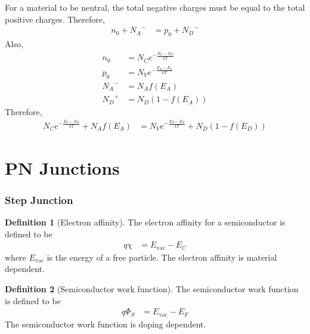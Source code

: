 \documentclass[titlepage, fleqn, a4paper, 12pt, twoside]{article}
\theoremstyle{definition}
\newtheorem{definition}{Definition}
\theoremstyle{theorem}
\begin{document}
For a material to be neutral, the total negative charges must be equal to the total positive charges.
Therefore,
\begin{align*}
	n_0 + {N_A}^- & = p_0 + {N_D}^-
\end{align*}
Also,
\begin{align*}
	n_0     & = N_C e^{-\frac{E_C - E_F}{k T}} \\
	p_0     & = N_V e^{-\frac{E_F - E_V}{k T}} \\
	{N_A}^- & = N_A f(E_A)                     \\
	{N_D}^+ & = N_D \left( 1 - f(E_A) \right)
\end{align*}
Therefore,
\begin{align*}
	N_C e^{-\frac{E_C - E_F}{k T}} + N_A f(E_A) & = N_V e^{-\frac{E_F - E_V}{k T}} + N_D \left( 1 - f(E_D) \right)
\end{align*}

\clearpage
\part{PN Junctions}

\section{Step Junction}

\begin{definition}[Electron affinity]
	The electron affinity for a semiconductor is defined to be
	\begin{align*}
		q \chi & = E_{\text{vac}} - E_C
	\end{align*}
	where $E_{\text{vac}}$ is the energy of a free particle.
	The electron affinity is material dependent.\\
\end{definition}

\begin{definition}[Semiconductor work function]
	The semiconductor work function is defined to be
	\begin{align*}
		q \Phi_S & = E_{\text{vac}} - E_F
	\end{align*}
	The semiconductor work function is doping dependent.
\end{definition}
\end{document}
